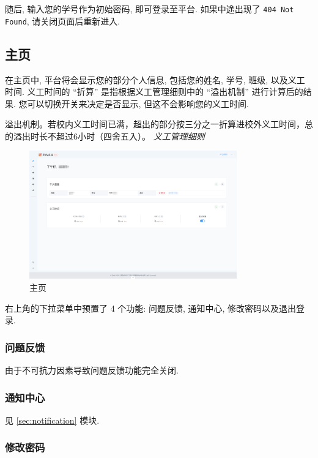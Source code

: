 \documentclass{article}
\begin{document}
随后, 输入您的学号作为初始密码, 即可登录至平台. 如果中途出现了 \texttt{404 Not Found}, 请关闭页面后重新进入.

\subsection{主页}

在主页中, 平台将会显示您的部分个人信息, 包括您的姓名, 学号, 班级, 以及义工时间. 义工时间的 ``折算'' 是指根据义工管理细则中的 ``溢出机制'' 进行计算后的结果. 您可以切换开关来决定是否显示, 但这不会影响您的义工时间.

\begin{mdframed}
  \fangsong
  溢出机制。若校内义工时间已满，超出的部分按三分之一折算进校外义工时间，总的溢出时长不超过6小时（四舍五入）。
  \hfill \textit{义工管理细则}
\end{mdframed}

\begin{figure}[H]
  \centering
  \includegraphics[width=0.8\textwidth]{../assets/image-20240303152245767.png}
  \caption{主页}
  \label{fig:home}
\end{figure}

右上角的下拉菜单中预置了 4 个功能: 问题反馈, 通知中心, 修改密码以及退出登录.

\subsubsection{问题反馈}

由于不可抗力因素导致问题反馈功能完全关闭.

\subsubsection{通知中心}

见 \ref{sec:notification} 模块.

\subsubsection{修改密码}
\end{document}
